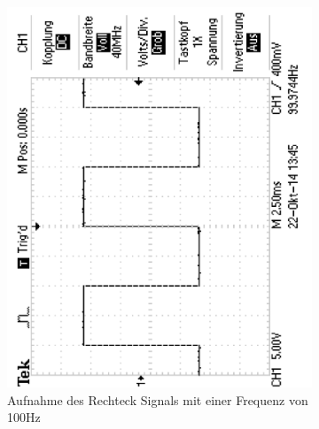 \documentclass[12pt,a4paper]{article}
\begin{document}
\begin{figure}[H]
        \centering
        \begin{subfigure}[b]{0.28\textwidth}
                \includegraphics[width=\textwidth , scale = 0.4, angle = -90]{2_1_rech_100hz.pdf}
                \caption[Aufnahme des Rechtecksignals mit einer Frequenz von 100Hz]{Aufnahme des Rechteck Signals mit einer Frequenz von 100Hz}
                \label{fig:2_1_rech_100hz}
        \end{subfigure}%
        ~ %
        \hfill
        \begin{subfigure}[b]{0.28\textwidth}

\end{subfigure}
\end{figure}
\end{document}
